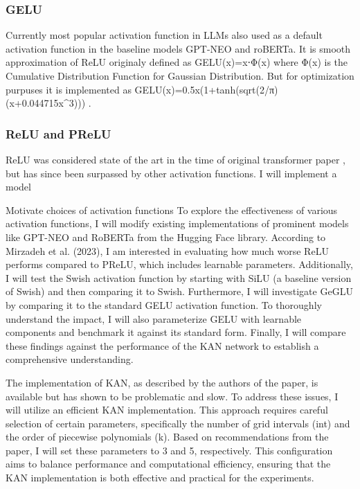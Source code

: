 \subsubsection{GELU}
Currently most popular activation function in LLMs also used as a default activation function in the baseline models GPT-NEO and roBERTa. It is smooth approximation of ReLU originaly defined as GELU(x)=x⋅Φ(x) where Φ(x) is the Cumulative Distribution Function for Gaussian Distribution. But for optimization purpuses it is implemented as GELU(x)=0.5x(1+tanh(sqrt(2/π)(x+0.044715x^3))) \cite{Hendrycks2016}.
\subsubsection{ReLU and PReLU}
ReLU was considered state of the art in the time of original transformer paper \cite{Vaswani2017}, but has since been surpassed by other activation functions. I will implement a model 

Motivate choices of activation functions
To explore the effectiveness of various activation functions, I will modify existing implementations of prominent models like GPT-NEO and RoBERTa from the Hugging Face library. According to Mirzadeh et al. (2023), I am interested in evaluating how much worse ReLU performs compared to PReLU, which includes learnable parameters. Additionally, I will test the Swish activation function by starting with SiLU (a baseline version of Swish) and then comparing it to Swish. Furthermore, I will investigate GeGLU by comparing it to the standard GELU activation function. To thoroughly understand the impact, I will also parameterize GELU with learnable components and benchmark it against its standard form. Finally, I will compare these findings against the performance of the KAN network to establish a comprehensive understanding.

The implementation of KAN, as described by the authors of the paper, is available but has shown to be problematic and slow. To address these issues, I will utilize an efficient KAN implementation. This approach requires careful selection of certain parameters, specifically the number of grid intervals (int) and the order of piecewise polynomials (k). Based on recommendations from the paper, I will set these parameters to 3 and 5, respectively. This configuration aims to balance performance and computational efficiency, ensuring that the KAN implementation is both effective and practical for the experiments.